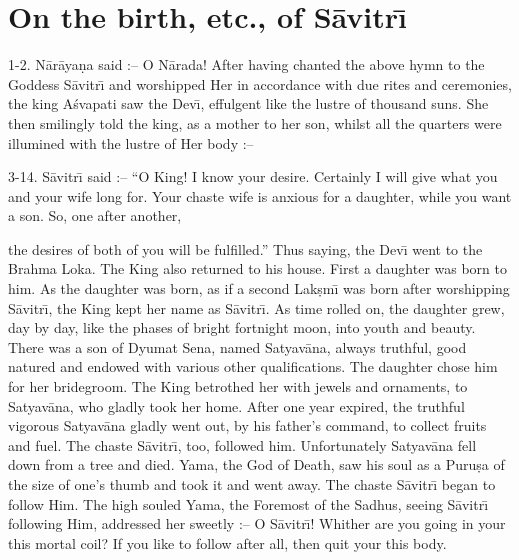 \chapter{On the birth, etc., of S\=avitr\={\i}}

1-2. N\=ar\=aya\d{n}a said :-- O N\=arada! After having chanted the above hymn to the Goddess S\=avitr\={\i} and worshipped Her in accordance with due rites and ceremonies, the king A\'svapati saw the Dev\={\i}, effulgent like the lustre of thousand suns. She then smilingly told the king, as a mother to her son, whilst all the quarters were illumined with the lustre of Her body :--

3-14. S\=avitr\={\i} said :-- ``O King! I know your desire. Certainly I will give what you and your wife long for. Your chaste wife is anxious for a daughter, while you want a son. So, one after another,

the desires of both of you will be fulfilled.'' Thus saying, the Dev\={\i} went to the Brahma Loka. The King also returned to his house. First a daughter was born to him. As the daughter was born, as if a second Lak\d{s}m\={\i} was born after worshipping S\=avitr\={\i}, the King kept her name as S\=avitr\={\i}. As time rolled on, the daughter grew, day by day, like the phases of bright fortnight moon, into youth and beauty. There was a son of Dyumat Sena, named Satyav\=ana, always truthful, good natured and endowed with various other qualifications. The daughter chose him for her bridegroom. The King betrothed her with jewels and ornaments, to Satyav\=ana, who gladly took her home. After one year expired, the truthful vigorous Satyav\=ana gladly went out, by his father's command, to collect fruits and fuel. The chaste S\=avitr\={\i}, too, followed him. Unfortunately Satyav\=ana fell down from a tree and died. Yama, the God of Death, saw his soul as a Puru\d{s}a of the size of one's thumb and took it and went away. The chaste S\=avitr\={\i} began to follow Him. The high souled Yama, the Foremost of the Sadhus, seeing S\=avitr\={\i} following Him, addressed her sweetly :-- O S\=avitr\={\i}! Whither are you going in your this mortal coil? If you like to follow after all, then quit your this body.

